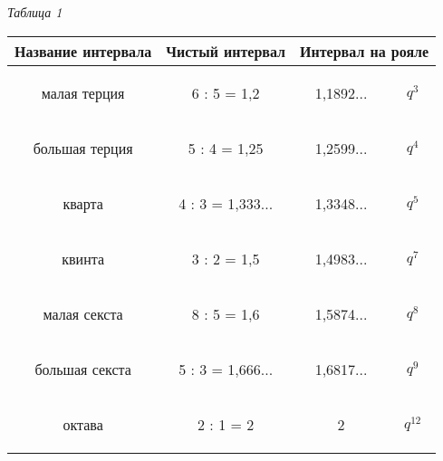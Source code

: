 \documentclass[a4paper,14pt]{article}
\begin{document}
    
    \begin{flushleft}
        \textit{Таблица 1}
    \end{flushleft}
    
    \noindent\begin{tabular}{|c|c|c|c|} 
        
        \hline 
        Название интервала & Чистый интервал & 
        \multicolumn{2}{c|}{Интервал на рояле} \\
        \hline
        \begin{flushleft}
            малая терция
        \end{flushleft}
             & 6 : 5 = 1,2 & 1,1892... & $q^3$ \\
        \hline
        \begin{flushleft}
            большая терция 
        \end{flushleft}
            & 5 : 4 = 1,25 & 1,2599... & $q^4$ \\
        \hline 
        \begin{flushleft}
            кварта     
        \end{flushleft}
        & 4 : 3 = 1,333... & 1,3348... & $q^5$ \\
        \hline
        \begin{flushleft}
            квинта
        \end{flushleft}
        & 3 : 2 = 1,5 & 1,4983... & $q^7$ \\
        \hline 
        \begin{flushleft}
            малая секста     
        \end{flushleft}
        & 8 : 5 = 1,6 & 1,5874... & $q ^ 8$ \\
        \hline 
        \begin{flushleft}
            большая секста     
        \end{flushleft}
        & 5 : 3 = 1,666... & 1,6817... & $q^9$ \\
        \hline 
        \begin{flushleft}
            октава     
        \end{flushleft}
        & 2 : 1 = 2 & 2 & $q^{12}$ \\
        \hline
         
    \end{tabular}
    
\end{document}
